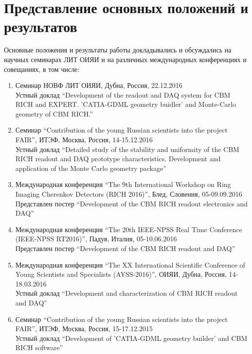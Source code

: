 \section*{Представление основных положений и результатов}


Основные положения и результаты работы докладывались и обсуждались на научных семинарах ЛИТ ОИЯИ и на различных международных конференциях и совещаниях, в том числе:

\begin{enumerate}

\item Семинар НОВФ ЛИТ ОИЯИ, Дубна, Россия, 22.12.2016 \\
Устный доклад ``Development of the readout and DAQ system for CBM RICH and EXPERT. 'CATIA-GDML geometry buidler' and Monte-Carlo geometry of CBM RICH.''

\item Семинар ``Contribution of the young Russian scientists into the project FAIR'', ИТЭФ, Москва, Россия, 14-15.12.2016 \\
Устный доклад ``Detailed study of the stability and uniformity of the CBM RICH readout and DAQ prototype characteristics. Development and application of the Monte Carlo geometry package''

\item Международная конференция ``The 9th International Workshop on Ring Imaging Cherenkov Detectors (RICH 2016)'', Блед, Словения, 05-09.09.2016 \\
Представлен постер ``Development of the CBM RICH readout electronics and DAQ''

\item Международная конференция ``The 20th IEEE-NPSS Real Time Conference (IEEE-NPSS RT2016)'', Падуя, Италия, 05-10.06.2016 \\
Представлен постер ``Development of the CBM RICH readout and DAQ''

\item Международная конференция ``The XX International Scientific Conference of Young Scientists and Specialists (AYSS-2016)'', ОИЯИ, Дубна, Россия, 14-18.03.2016 \\
Устный доклад ``Development and characterization of CBM RICH readout and DAQ''

\item Семинар ``Contribution of the young Russian scientists into the project FAIR'', ИТЭФ, Москва, Россия, 15-17.12.2015 \\
Устный доклад ``Development of 'CATIA-GDML geometry builder' and CBM RICH software''


\end{enumerate}
